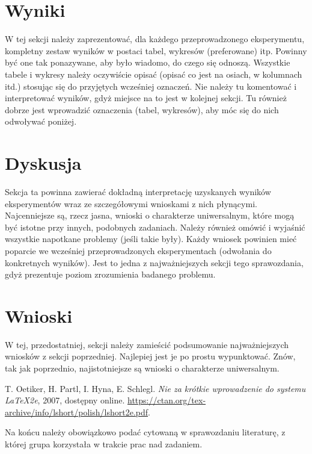 \documentclass{classrep}
\begin{document}
\section{Wyniki}
{\color{blue}
W tej sekcji należy zaprezentować, dla każdego przeprowadzonego eksperymentu,
kompletny zestaw wyników w postaci tabel, wykresów (preferowane) itp. Powinny
być one tak ponazywane, aby było wiadomo, do czego się odnoszą. Wszystkie
tabele i wykresy należy oczywiście opisać (opisać co jest na osiach, w
kolumnach itd.) stosując się do przyjętych wcześniej oznaczeń. Nie należy tu
komentować i interpretować wyników, gdyż miejsce na to jest w kolejnej sekcji.
Tu również dobrze jest wprowadzić oznaczenia (tabel, wykresów), aby móc się do
nich odwoływać poniżej.}

\section{Dyskusja}
{\color{blue}
Sekcja ta powinna zawierać dokładną interpretację uzyskanych wyników
eksperymentów wraz ze szczegółowymi wnioskami z nich płynącymi. Najcenniejsze
są, rzecz jasna, wnioski o charakterze uniwersalnym, które mogą być istotne
przy innych, podobnych zadaniach. Należy również omówić i wyjaśnić wszystkie
napotkane problemy (jeśli takie były). Każdy wniosek powinien mieć poparcie we
wcześniej przeprowadzonych eksperymentach (odwołania do konkretnych wyników).
Jest to jedna z najważniejszych sekcji tego sprawozdania, gdyż prezentuje
poziom zrozumienia badanego problemu.}

\section{Wnioski}
{\color{blue}
W tej, przedostatniej, sekcji należy zamieścić podsumowanie najważniejszych
wniosków z sekcji poprzedniej. Najlepiej jest je po prostu wypunktować. Znów,
tak jak poprzednio, najistotniejsze są wnioski o charakterze uniwersalnym.}

\begin{thebibliography}{0}
   T. Oetiker, H. Partl, I. Hyna, E. Schlegl.
    \textsl{Nie za krótkie wprowadzenie do systemu \LaTeX2e}, 2007, dostępny
    online. \url{https://ctan.org/tex-archive/info/lshort/polish/lshort2e.pdf}.
\end{thebibliography}

{\color{blue}
Na końcu należy obowiązkowo podać cytowaną w sprawozdaniu literaturę, z której
grupa korzystała w trakcie prac nad zadaniem.}
\end{document}
